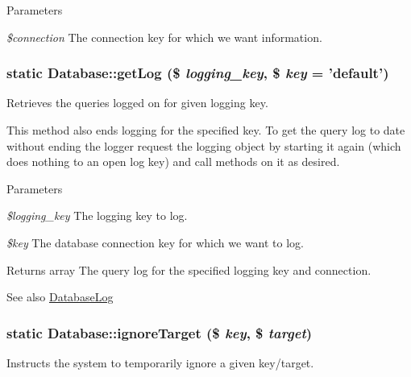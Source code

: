 \begin{DoxyParams}{Parameters}
\item[{\em \$connection}]The connection key for which we want information. \end{DoxyParams}
\hypertarget{classDatabase_a0a11c88ba9539bff6131c8fae25e504d}{
\subsubsection[{getLog}]{\setlength{\rightskip}{0pt plus 5cm}static Database::getLog (\$ {\em logging\_\-key}, \/  \$ {\em key} = {\ttfamily 'default'})}}
\label{classDatabase_a0a11c88ba9539bff6131c8fae25e504d}
Retrieves the queries logged on for given logging key.

This method also ends logging for the specified key. To get the query log to date without ending the logger request the logging object by starting it again (which does nothing to an open log key) and call methods on it as desired.


\begin{DoxyParams}{Parameters}
\item[{\em \$logging\_\-key}]The logging key to log. \item[{\em \$key}]The database connection key for which we want to log.\end{DoxyParams}
\begin{DoxyReturn}{Returns}
array The query log for the specified logging key and connection.
\end{DoxyReturn}
\begin{DoxySeeAlso}{See also}
\hyperlink{classDatabaseLog}{DatabaseLog} 
\end{DoxySeeAlso}
\hypertarget{classDatabase_a574ba08b096e4051b221166fc0bc4d21}{
\subsubsection[{ignoreTarget}]{\setlength{\rightskip}{0pt plus 5cm}static Database::ignoreTarget (\$ {\em key}, \/  \$ {\em target})}}
\label{classDatabase_a574ba08b096e4051b221166fc0bc4d21}
Instructs the system to temporarily ignore a given key/target.

